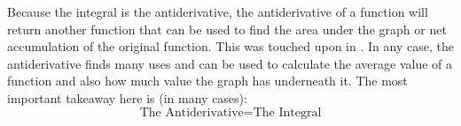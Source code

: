 \documentclass[../revisedmain.tex]{subfiles}
\begin{document}
Because the integral is the antiderivative, the antiderivative of a function will return another function that can be used to find the area under the graph or net accumulation of the original function. This was touched upon in . In any case, the antiderivative finds many uses and can be used to calculate the average value of a function and also how much value the graph has underneath it. The most important takeaway here is (in many cases):$$\text{The Antiderivative} = \text{The Integral}$$	
\end{document}
